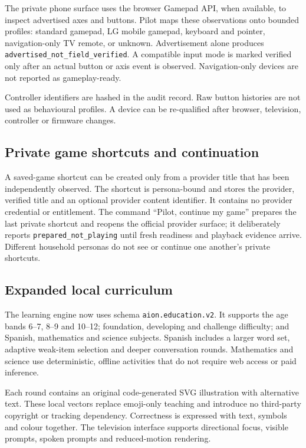 The private phone surface uses the browser Gamepad API, when available, to inspect
advertised axes and buttons.  Pilot maps these observations onto bounded profiles:
standard gamepad, LG mobile gamepad, keyboard and pointer, navigation-only TV remote, or
unknown.  Advertisement alone produces
\texttt{advertised\_not\_field\_verified}.  A compatible input mode is marked verified
only after an actual button or axis event is observed.  Navigation-only devices are not
reported as gameplay-ready.

Controller identifiers are hashed in the audit record.  Raw button histories are not
used as behavioural profiles.  A device can be re-qualified after browser, television,
controller or firmware changes.

\subsection{Private game shortcuts and continuation}

A saved-game shortcut can be created only from a provider title that has been independently
observed.  The shortcut is persona-bound and stores the provider, verified title and an
optional provider content identifier.  It contains no provider credential or entitlement.
The command ``Pilot, continue my game'' prepares the last private shortcut and reopens the
official provider surface; it deliberately reports \texttt{prepared\_not\_playing} until
fresh readiness and playback evidence arrive.  Different household personas do not see or
continue one another's private shortcuts.

\subsection{Expanded local curriculum}

The learning engine now uses schema \texttt{aion.education.v2}.  It supports the age bands
6--7, 8--9 and 10--12; foundation, developing and challenge difficulty; and Spanish,
mathematics and science subjects.  Spanish includes a larger word set, adaptive weak-item
selection and deeper conversation rounds.  Mathematics and science use deterministic,
offline activities that do not require web access or paid inference.

Each round contains an original code-generated SVG illustration with alternative text.
These local vectors replace emoji-only teaching and introduce no third-party copyright or
tracking dependency.  Correctness is expressed with text, symbols and colour together.
The television interface supports directional focus, visible prompts, spoken prompts and
reduced-motion rendering.

